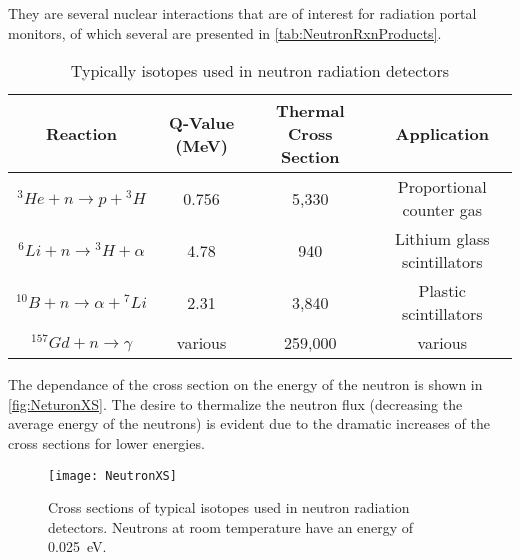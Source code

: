 They are several nuclear interactions that are of interest for radiation portal monitors, of which several are presented in \autoref{tab:NeutronRxnProducts}.
\begin{table}
	\caption[Neutron Reactions and Reaction Energies]{Typically isotopes used in neutron radiation detectors}
	\label{tab:NeutronRxnProducts}
	\begin{tabular}{ c | c c c} 
		\toprule
		Reaction                           & Q-Value (MeV) & Thermal Cross Section & Application \\
		\midrule
		${}^3He + n \to p +{}^3H$          & 0.756     & 5,330 & Proportional counter gas \\
		${}^6Li + n \to {}^3H + \alpha$    & 4.78      & 940 & Lithium glass scintillators \\
		${}^{10}B + n \to \alpha + {}^7Li$ & 2.31      & 3,840 & Plastic scintillators \\
		${}^{157}Gd + n \to \gamma$        &various    & 259,000 & various \\
		\bottomrule
	\end{tabular}
\end{table}
The dependance of the cross section on the energy of the neutron is shown in \autoref{fig:NeturonXS}.
The desire to thermalize the neutron flux (decreasing the average energy of the neutrons) is evident due to the dramatic increases of the cross sections for lower energies.
\begin{figure}
	\centering
	\texttt{[image: NeutronXS]}
	\caption[Neutron Reaction Cross Sections]{Cross sections of typical isotopes used in neutron radiation detectors.  Neutrons at room temperature have an energy of \SI{0.025}{\eV}.}
	\label{fig:NeutronXS}
\end{figure}
